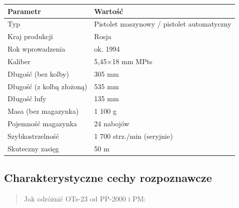 \documentclass[12pt,oneside]{book}
\begin{document}
\begin{longtable}[]{@{}ll@{}}
\toprule\noalign{}
Parametr & Wartość \\
\midrule\noalign{}
\endhead
\bottomrule\noalign{}
\endlastfoot
Typ & Pistolet maszynowy / pistolet automatyczny \\
Kraj produkcji & Rosja \\
Rok wprowadzenia & ok. 1994 \\
Kaliber & 5,45×18 mm MPts \\
Długość (bez kolby) & 305 mm \\
Długość (z kolbą złożoną) & 535 mm \\
Długość lufy & 135 mm \\
Masa (bez magazynka) & 1 100 g \\
Pojemność magazynka & 24 nabojów \\
Szybkostrzelność & 1 700 strz./min (seryjnie) \\
Skuteczny zasięg & 50 m \\
\end{longtable}

\subsection{Charakterystyczne cechy
rozpoznawcze}\label{charakterystyczne-cechy-rozpoznawcze-110}

\begin{quote}
Jak odróżnić OTs-23 od PP-2000 i PM:
\end{quote}
\end{document}
